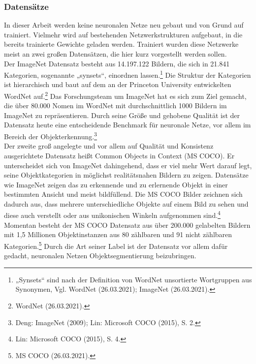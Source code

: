 \documentclass[a4paper,12pt,ngerman]{article}
\begin{document}
\subsubsection{Datensätze}
In dieser Arbeit werden keine neuronalen Netze neu gebaut und von Grund auf trainiert. Vielmehr wird auf bestehenden Netzwerkstrukturen aufgebaut, in die bereits trainierte Gewichte geladen werden. Trainiert wurden diese Netzwerke meist an zwei großen Datensätzen, die hier kurz vorgestellt werden sollen. \\
Der ImageNet Datensatz besteht aus 14.197.122 Bildern, die sich in 21.841 Kategorien, sogenannte „synsets“, einordnen lassen.\footnote{„Synsets“ sind nach der Definition von WordNet unsortierte Wortgruppen aus Synonymen, Vgl. WordNet (26.03.2021); ImageNet (26.03.2021).}  Die Struktur der Kategorien ist hierarchisch und baut auf dem an der Princeton University entwickelten WordNet auf.\footnote{WordNet (26.03.2021).}  Das Forschungsteam um ImageNet hat es sich zum Ziel gemacht, die über 80.000 Nomen im WordNet mit durchschnittlich 1000 Bildern im ImageNet zu repräsentieren. Durch seine Größe und gehobene Qualität ist der Datensatz heute eine entscheidende Benchmark für neuronale Netze, vor allem im Bereich der Objekterkennung.\footnote{Deng: ImageNet (2009); Lin: Microsoft COCO (2015), S. 2.} \\
Der zweite groß angelegte und vor allem auf Qualität und Konsistenz ausgerichtete Datensatz heißt Common Objects in Context (MS COCO). Er unterscheidet sich von ImageNet dahingehend, dass er viel mehr Wert darauf legt, seine Objektkategorien in möglichst realitätsnahen Bildern zu zeigen. Datensätze wie ImageNet zeigen das zu erkennende und zu erlernende Objekt in einer bestimmten Ansicht und meist bildfüllend. Die MS COCO Bilder zeichnen sich dadurch aus, dass mehrere unterschiedliche Objekte auf einem Bild zu sehen und diese auch verstellt oder aus unikonischen Winkeln aufgenommen sind.\footnote{Lin: Microsoft COCO (2015), S. 4.} \\
Momentan besteht der MS COCO Datensatz aus über 200.000 gelabelten Bildern mit 1,5 Millionen Objektinstanzen aus 80 zählbaren und 91 nicht zählbaren Kategorien.\footnote{MS COCO (26.03.2021).} Durch die Art seiner Label ist der Datensatz vor allem dafür gedacht, neuronalen Netzen Objektsegmentierung beizubringen.
\end{document}
